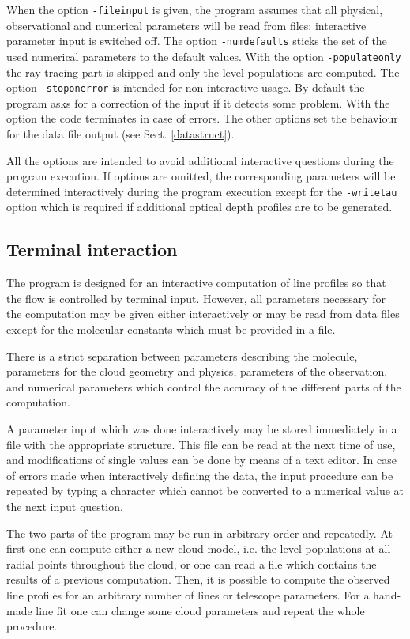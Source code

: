 When the option {\tt -fileinput} is given, the program assumes that
all physical, observational and numerical parameters will be read
from files; interactive parameter input is switched off.
The option {\tt -numdefaults} sticks the set of the used numerical
parameters to the default values. With the option {\tt -populateonly}
the ray tracing part is skipped and only the level populations are
computed. The option {\tt -stoponerror} is intended for non-interactive
usage. By default the program asks for a correction of the input if
it detects some problem. With the option the code terminates in
case of errors.  The other options set the 
behaviour for the data file output (see Sect. \ref{datastruct}). 

All the options are intended to avoid additional interactive questions
during the program execution. If options are omitted, the corresponding 
parameters will be determined interactively during the program execution
except for the {\tt -writetau} option which is required if additional
optical depth profiles are to be generated.

\subsection{Terminal interaction}

The program is designed for an interactive computation of line
profiles so that the  flow is controlled by terminal
input. However, all parameters necessary for the computation
may be given either interactively or may be read from data files
except for the molecular constants which must be provided in a file.

There is a strict separation between parameters describing the 
molecule, parameters for the cloud geometry and physics, parameters 
of the observation, and numerical
parameters which control the accuracy of the different parts
of the computation.

A parameter input which was done interactively may be stored 
immediately in a file with the appropriate structure. This file can be read
at the next time of use, and modifications of single values
can be done by means of a text editor. In case of errors made
when interactively defining the data, the input procedure can be 
repeated by typing a character which cannot be converted to a numerical 
value at the next input question.

The two parts of the program may be run in arbitrary order
and repeatedly. At first one can compute either a new
cloud model, i.e. the level populations at all radial
points throughout the cloud, or one can read a file which
contains the results of a previous computation. Then, it is
possible to compute the observed line profiles for an arbitrary
number of lines or telescope parameters. For a hand-made line
fit one can change some cloud parameters and repeat the whole
procedure.

